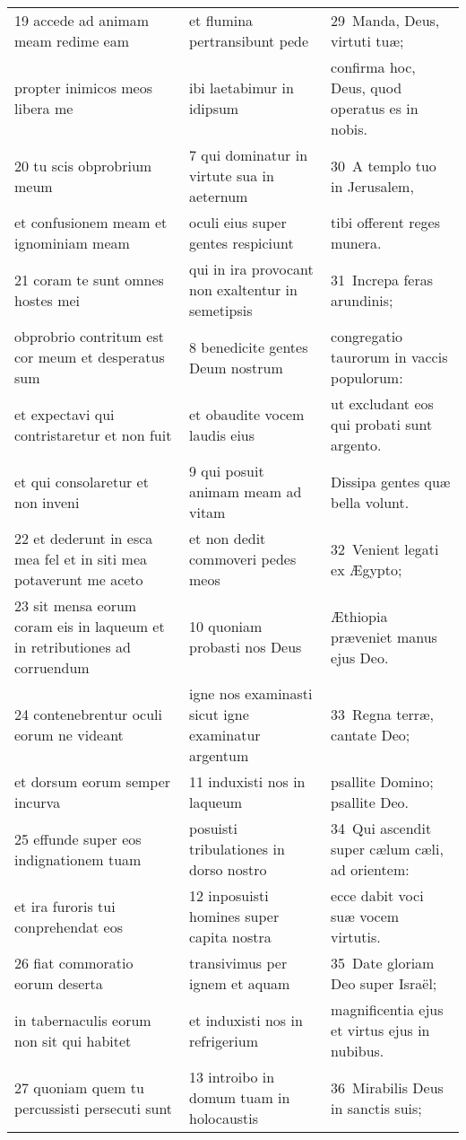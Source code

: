 \documentclass{article}
\begin{document}
\begin{longtable}{@{}p{}p{}p{}@{}}
19 accede ad animam meam redime eam	&	et flumina pertransibunt pede	&	29 Manda, Deus, virtuti tuæ;	\\
propter inimicos meos libera me	&	ibi laetabimur in idipsum	&	confirma hoc, Deus, quod operatus es in nobis.	\\
20 tu scis obprobrium meum	&	7 qui dominatur in virtute sua in aeternum	&	30 A templo tuo in Jerusalem,	\\
et confusionem meam et ignominiam meam	&	oculi eius super gentes respiciunt	&	tibi offerent reges munera.	\\
21 coram te sunt omnes hostes mei	&	qui in ira provocant non exaltentur in semetipsis	&	31 Increpa feras arundinis;	\\
obprobrio contritum est cor meum et desperatus sum	&	8 benedicite gentes Deum nostrum	&	congregatio taurorum in vaccis populorum:	\\
et expectavi qui contristaretur et non fuit	&	et obaudite vocem laudis eius	&	ut excludant eos qui probati sunt argento.	\\
et qui consolaretur et non inveni	&	9 qui posuit animam meam ad vitam	&	Dissipa gentes quæ bella volunt.	\\
22 et dederunt in esca mea fel et in siti mea potaverunt me aceto	&	et non dedit commoveri pedes meos	&	32 Venient legati ex Ægypto;	\\
23 sit mensa eorum coram eis in laqueum et in retributiones ad corruendum	&	10 quoniam probasti nos Deus	&	Æthiopia præveniet manus ejus Deo.	\\
24 contenebrentur oculi eorum ne videant	&	igne nos examinasti sicut igne examinatur argentum	&	33 Regna terræ, cantate Deo;	\\
et dorsum eorum semper incurva	&	11 induxisti nos in laqueum	&	psallite Domino; psallite Deo.	\\
25 effunde super eos indignationem tuam	&	posuisti tribulationes in dorso nostro	&	34 Qui ascendit super cælum cæli, ad orientem:	\\
et ira furoris tui conprehendat eos	&	12 inposuisti homines super capita nostra	&	ecce dabit voci suæ vocem virtutis.	\\
26 fiat commoratio eorum deserta	&	transivimus per ignem et aquam	&	35 Date gloriam Deo super Israël;	\\
in tabernaculis eorum non sit qui habitet	&	et induxisti nos in refrigerium	&	magnificentia ejus et virtus ejus in nubibus.	\\
27 quoniam quem tu percussisti persecuti sunt	&	13 introibo in domum tuam in holocaustis	&	36 Mirabilis Deus in sanctis suis;	\\

\end{longtable}
\end{document}
